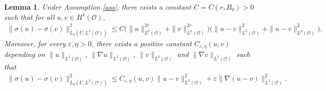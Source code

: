 \documentclass[reqno, 11pt]{amsart}
\newtheorem{lem}{Lemma}
\theoremstyle{definition}
\numberwithin{equation}{section} \numberwithin{lem}{section}
\numberwithin{thm}{section} \numberwithin{prop}{section}
\numberwithin{cor}{section} \numberwithin{rem}{section}
\numberwithin{defn}{section}
\begin{document}
\begin{lem}\label{lem_sigma}
Under Assumption \ref{ass}, there exists a constant $C=C(r,B_0)>0$ such that for all
$u,v\in H^1(\mathcal O)$,
\begin{align}\label{sigma_1}
    \|\sigma(u)-\sigma(v)\|_{L_2(U,L^2(\mathcal O))}^2
\le
C\Big(\|u\|_{L^p(\mathcal O)}^{2r}+\|v\|_{L^p(\mathcal O)}^{2r}\Big)
\Big(
\|u-v\|_{L^2(\mathcal O)}^2+\|u-v\|_{L^p(\mathcal O)}^2
\Big).
\end{align}
Moreover, for every $\varepsilon,\eta>0$, there exists a positive constant $C_{\varepsilon,\eta}(u,v)$
depending on $\|u\|_{L^2(\mathcal O)}$, $\|\nabla u\|_{L^2(\mathcal O)}$,
$\|v\|_{L^2(\mathcal O)}$ and $\|\nabla v\|_{L^2(\mathcal O)}$ such that
\begin{align}\label{sigma_2}
    \|\sigma(u)-\sigma(v)\|_{L_2(U,L^2(\mathcal O))}^2
\le
C_{\varepsilon,\eta }(u,v)\|u-v\|_{L^2(\mathcal O)}^2
+
\varepsilon\|\nabla(u-v)\|_{L^2(\mathcal O)}^2.
\end{align}
\end{lem}
\end{document}
